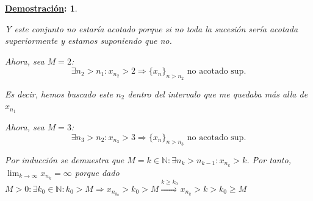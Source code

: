 \documentclass[10pt,a4paper,openright]{book}
\theoremstyle{break}
\newtheorem*{demo}{\underline{Demostración}:}
\begin{document}
\begin{demo}
\begin{itemize}
Y este conjunto no estaría acotado porque si no toda la sucesión sería acotada superiormente y estamos suponiendo que no.

Ahora, sea $M=2$:
$$\exists n_2>n_1: x_{n_2}>2\Rightarrow \{x_n\}_{n>n_2}\mbox{ no acotado sup.}$$

Es decir, hemos buscado este $n_2$ dentro del intervalo que me quedaba más alla de $x_{n_1}$

Ahora, sea $M=3$:
$$\exists n_3>n_2: x_{n_3}>3\Rightarrow \{x_n\}_{n>n_3}\mbox{ no acotado sup.}$$


Por inducción se demuestra que $M=k\in \mathbb N: \exists n_k>n_{k-1}: x_{n_k}>k$. Por tanto, $\lim_{k\rightarrow \infty} x_{n_k}=\infty$ porque dado $M>0: \exists k_0\in \mathbb N: k_0>M\Rightarrow x_{n_{k_0}}>k_0>M\stackrel{k\geq k_0}{\Rightarrow} x_{n_k}>k>k_0\geq M$
\end{itemize}
\end{demo}
\end{document}
